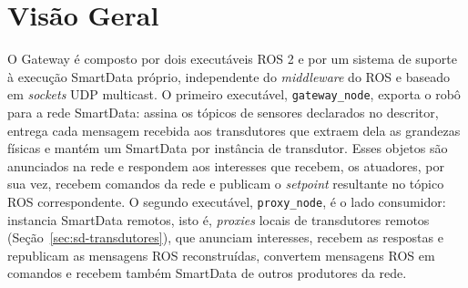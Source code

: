 \documentclass[
    12pt,
    oneside,
    a4paper,
    chapter=TITLE,
    section=TITLE,
    english,
    brazil
]{abntex2}
\begin{document}
\section{Visão Geral}
\label{sec:visao}

O Gateway é composto por dois executáveis ROS 2 e por um sistema de suporte
à execução SmartData próprio, independente do \textit{middleware} do ROS
e baseado em \textit{sockets} UDP multicast. O primeiro executável,
\texttt{gateway\_node}, exporta o robô para a rede SmartData: assina os
tópicos de sensores declarados no descritor, entrega cada mensagem
recebida aos transdutores que extraem dela as grandezas físicas e mantém
um SmartData por instância de transdutor. Esses objetos são anunciados na
rede e respondem aos interesses que recebem, os atuadores, por sua vez,
recebem comandos da rede e publicam o \textit{setpoint} resultante no
tópico ROS correspondente. O segundo executável, \texttt{proxy\_node}, é o
lado consumidor: instancia SmartData remotos, isto é, \textit{proxies} locais de
transdutores remotos (Seção~\ref{sec:sd-transdutores}), que anunciam interesses, recebem as respostas e
republicam as mensagens ROS reconstruídas, convertem mensagens ROS em
comandos e recebem também SmartData de outros produtores da rede.
\end{document}
